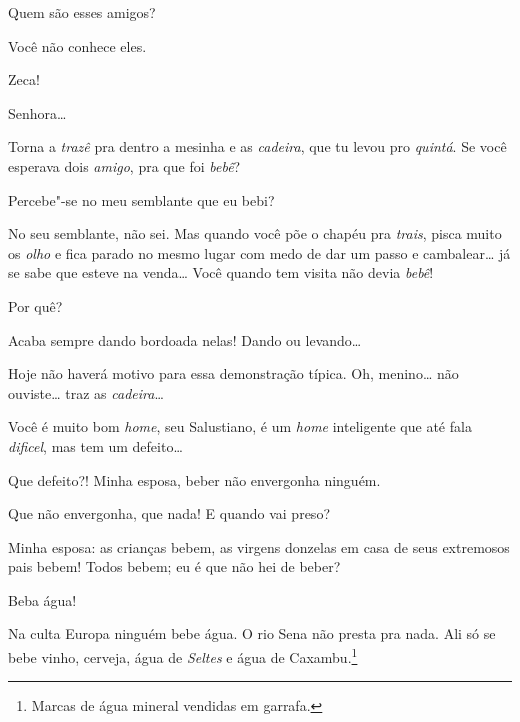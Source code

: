  Quem
são esses amigos?

 Você não conhece eles.

  Zeca!

  
Senhora\ldots{} 

 Torna a
\textit{trazê} pra dentro a mesinha e as
\textit{cadeira}, que tu levou pro
\textit{quintá}.  Se
você esperava dois \textit{amigo},
pra que foi \textit{bebê}?

 
Percebe"-se no meu semblante que eu bebi?

 No seu
semblante, não sei. Mas quando você põe o
chapéu pra \textit{trais}, pisca muito os
\textit{olho} e fica parado no mesmo lugar com medo
de dar um passo e cambalear\ldots{} já se sabe que esteve
na venda\ldots{} Você quando tem visita não
devia \textit{bebê}!

 Por
quê?

 Acaba sempre dando bordoada
nelas! Dando ou levando\ldots

 Hoje não haverá
motivo para essa demonstração típica.
 Oh,
menino\ldots{} não ouviste\ldots{} traz as
\textit{cadeira}\ldots

 Você é muito
bom \textit{home}, seu Salustiano, é um
\textit{home} inteligente que até
fala \textit{dificel}, mas tem um
defeito\ldots

 Que defeito?!
Minha esposa, beber não envergonha ninguém.

 Que
não envergonha, que nada! E quando vai preso?

 Minha esposa:
as crianças bebem, as virgens donzelas em casa de
seus extremosos pais bebem! Todos bebem; eu é que
não hei de beber?

 Beba
água!

 Na culta Europa
ninguém bebe água. O rio Sena não
presta pra nada. Ali só se bebe vinho,
cerveja, água de \textit{Seltes} e
água de Caxambu.\footnote{ 
Marcas de água mineral vendidas em garrafa.}




